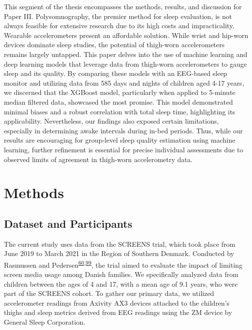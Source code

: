 \documentclass[
  9pt,
]{scrbook}
\begin{document}
This segment of the thesis encompasses the methods, results, and
discussion for Paper III. Polysomnography, the premier method for sleep
evaluation, is not always feasible for extensive research due to its
high costs and impracticality. Wearable accelerometers present an
affordable solution. While wrist and hip-worn devices dominate sleep
studies, the potential of thigh-worn accelerometers remains largely
untapped. This paper delves into the use of machine learning and deep
learning models that leverage data from thigh-worn accelerometers to
gauge sleep and its quality. By comparing these models with an EEG-based
sleep monitor and utilizing data from 585 days and nights of children
aged 4-17 years, we discerned that the XGBoost model, particularly when
applied to 5-minute median filtered data, showcased the most promise.
This model demonstrated minimal biases and a robust correlation with
total sleep time, highlighting its applicability. Nevertheless, our
findings also exposed certain limitations, especially in determining
awake intervals during in-bed periods. Thus, while our results are
encouraging for group-level sleep quality estimation using machine
learning, further refinement is essential for precise individual
assessments due to observed limits of agreement in thigh-worn
accelerometry data.

\hypertarget{methods-2}{%
\section{Methods}\label{methods-2}}

\hypertarget{dataset-and-participants}{%
\subsection{Dataset and Participants}\label{dataset-and-participants}}

The current study uses data from the SCREENS trial, which took place
from June 2019 to March 2021 in the Region of Southern Denmark.
Conducted by Rasmussen and
Pedersen\textsuperscript{\protect\hyperlink{ref-rasmussen_short-term_2020}{60},\protect\hyperlink{ref-pedersen_effects_2022}{99}},
the trial aimed to evaluate the impact of limiting screen media usage
among Danish families. We specifically analyzed data from children
between the ages of 4 and 17, with a mean age of 9.1 years, who were
part of the SCREENS cohort. To gather our primary data, we utilized
accelerometer readings from Axivity AX3 devices attached to the
children's thighs and sleep metrics derived from EEG readings using the
ZM device by General Sleep Corporation.
\end{document}
